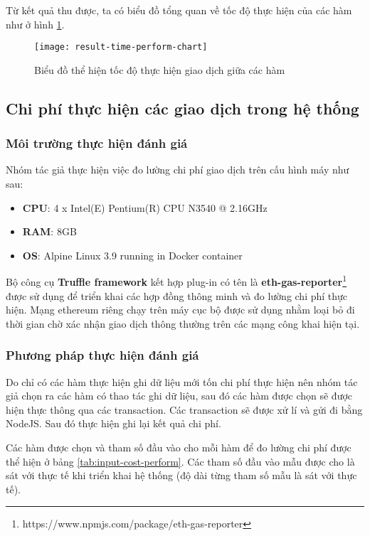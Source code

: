 \documentclass[../main-report.tex]{subfiles}
\begin{document}
Từ kết quả thu được, ta có biểu đồ tổng quan về tốc độ thực hiện của các hàm như ở hình \ref{fig:result-time-perform-chart}.

\begin{figure}[ht!]
\begin{center}
\label{fig:result-time-perform-chart}
\texttt{[image: result-time-perform-chart]}
\caption{Biểu đồ thể hiện tốc độ thực hiện giao dịch giữa các hàm}
\end{center}
\end{figure}

\subsection{Chi phí thực hiện các giao dịch trong hệ thống}
\subsubsection{Môi trường thực hiện đánh giá}
Nhóm tác giả thực hiện việc đo lường chi phí giao dịch trên cấu hình máy như sau:

\begin{itemize}
\item \textbf{CPU}: 4 x Intel(E) Pentium(R) CPU N3540 @ 2.16GHz
\item \textbf{RAM}: 8GB
\item \textbf{OS}: Alpine Linux 3.9 running in Docker container
\end{itemize}

Bộ công cụ \textbf{Truffle framework} kết hợp plug-in có tên là \textbf{eth-gas-reporter}\footnote{https://www.npmjs.com/package/eth-gas-reporter} được sử dụng để triển khai các hợp đồng thông minh và đo lường chi phí thực hiện. Mạng ethereum riêng chạy trên máy cục bộ được sử dụng nhằm loại bỏ đi thời gian chờ xác nhận giao dịch thông thường trên các mạng công khai hiện tại.
\subsubsection{Phương pháp thực hiện đánh giá}
Do chỉ có các hàm thực hiện ghi dữ liệu mới tốn chi phí thực hiện nên nhóm tác giả chọn ra các hàm có thao tác ghi dữ liệu, sau đó các hàm được chọn sẽ được hiện thực thông qua các \gls{transaction}. Các \gls{transaction} sẽ được xử lí và gửi đi bằng NodeJS. Sau đó thực hiện ghi lại kết quả chi phí.

Các hàm được chọn và tham số đầu vào cho mỗi hàm để đo lường chi phí được thể hiện ở bảng \ref{tab:input-cost-perform}. Các tham số đầu vào mẫu được cho là sát với thực tế khi triển khai hệ thống (độ dài từng tham số mẫu là sát với thực tế).
\end{document}
